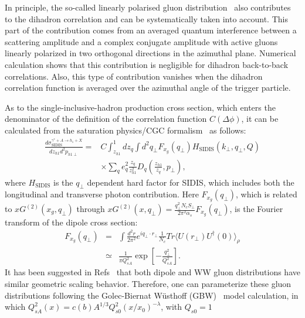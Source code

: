 In principle, the so-called linearly polarised gluon
distribution~\cite{Metz:2011wb,Dominguez:2011br} also contributes to the dihadron
correlation and can be systematically taken into account. This part of the
contribution comes from an averaged quantum interference between a scattering
amplitude and a complex conjugate amplitude with active gluons linearly
polarized in two orthogonal directions in the azimuthal plane. Numerical
calculation shows that this contribution is negligible for dihadron back-to-back
correlations. Also, this type of contribution vanishes when the dihadron correlation function 
is averaged over the azimuthal angle of the trigger particle. 


As to the single-inclusive-hadron production cross section, which enters the
denominator of the definition of the correlation function $C(\Delta\phi)$, it
can be calculated from the saturation physics/CGC formalism~\cite{Marquet:2009ca} as
follows:
\begin{eqnarray}\label{eqn:xstrigCGC}
\frac{d\sigma^{\gamma^{*}+A\rightarrow h_{1}+X}_{\textrm{SIDIS}}}{dz_{h1}d^{2}p_{h1\perp}} 
= & C \int^{1}_{z_{h1}}dz_{q} \int
d^{2}q_{\perp}F_{x_{g}}(q_{\perp})H_{\textrm{SIDIS}}(k_{\perp},q_{\perp},Q) \nonumber \\ 
  & \times \sum_{q} e^{2}_{q}\frac{z_{q}}{z^{2}_{h1}}D_{q}(\frac{z_{h1}}{z_{q}},p_{\perp}),
\end{eqnarray}
where $H_{\textrm{SIDIS}}$ is the $q_{\perp}$ dependent hard factor for SIDIS,
which includes both the longitudinal and transverse photon contribution. Here
$F_{x_{g}}(q_\perp)$, which is related to $xG^{(2)}(x_g,q_\perp)$ through $xG^{(2)}(x,q_{\perp})=\frac{q^{2}_{\perp}N_{c}S_{\perp}}{2\pi^{2}\alpha_{s}}F_{x_{g}}(q_{\perp})$, is the Fourier
transform of the dipole cross section:
\begin{eqnarray}
F_{x_{g}}(q_{\perp})& = &\int \frac{d^{2}r}{2\pi^{2}}e^{iq_{\perp}\cdot
r_{\perp}} \frac{1}{N_{c}} Tr\langle
U(r_{\perp})U^{\dag}(0)\rangle_{\rho} \nonumber \\ 
& \simeq &\frac{1}{\pi
Q^{2}_{sA}}\exp[-\frac{q_{\perp}^{2}}{Q^{2}_{sA}}]. 
\end{eqnarray}
It has been suggested in Refs~\cite{Dominguez:2011gc, Dumitru:2011vk} that both
dipole and WW gluon distributions have similar geometric scaling behavior.
Therefore, one can parameterize these gluon distributions following the
Golec-Biernat W\"{u}sthoff (GBW)~\cite{GolecBiernat:1998js} model calculation, in
which $Q^{2}_{sA}(x)=c(b)A^{1/3}Q^{2}_{s0}(x/x_{0})^{-\lambda}$, with $Q_{s0}=1$
